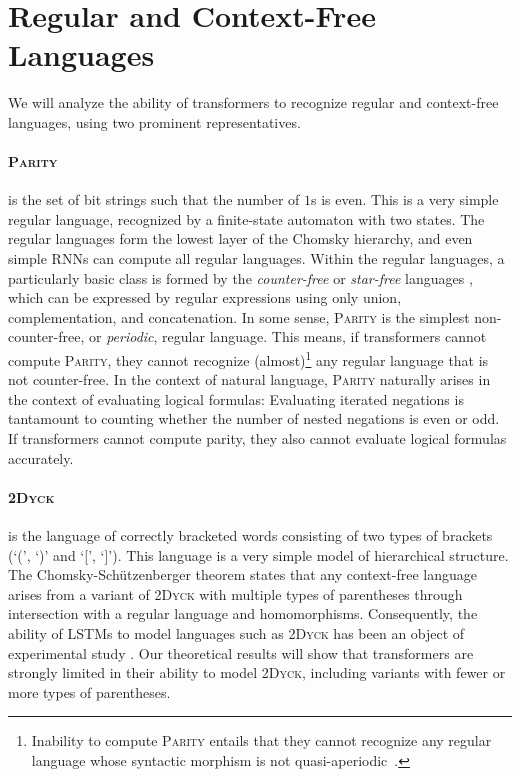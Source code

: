 \documentclass[11pt,a4paper]{article}
\newcounter{theorem}
\begin{document}
\section{Regular and Context-Free Languages}\label{sec:langs} 

We will analyze the ability of transformers to recognize regular and context-free languages, using two prominent representatives. 


\paragraph{\textsc{Parity}} is the set of bit strings such that the number of $1$s is even.
This is a very simple regular language, recognized by a finite-state automaton with two states.
The regular languages form the lowest layer of the Chomsky hierarchy, and even simple RNNs can compute all regular languages.
Within the regular languages, a particularly basic class is formed by the \emph{counter-free} or \emph{star-free} languages \cite{mcnaughton1971counter}, which can be expressed by regular expressions using only union, complementation, and concatenation.
In some sense, \textsc{Parity} is the simplest non-counter-free, or \emph{periodic}, regular language.
This means, if transformers cannot compute \textsc{Parity}, they cannot recognize (almost)\footnote{Inability to compute \textsc{Parity} entails that they cannot recognize any regular language whose syntactic morphism is not quasi-aperiodic~\cite[p. 488]{barrington1992regular}.} any regular language that is not counter-free.
In the context of natural language, \textsc{Parity} naturally arises in the context of evaluating logical formulas:
Evaluating iterated negations is tantamount to counting whether the number of nested negations is even or odd.
If transformers cannot compute parity, they also cannot evaluate logical formulas accurately.











\paragraph{\textsc{2Dyck}} is the language of correctly bracketed words consisting of two types of brackets (`(', `)' and `[', `]').
This language is a very simple model of hierarchical structure.
The Chomsky-Sch{\"u}tzenberger theorem \cite{chomsky1963algebraic} states that any context-free language arises from a variant of \textsc{2Dyck} with multiple types of parentheses through intersection with a regular language and homomorphisms.
Consequently, the ability of LSTMs to model languages such as \textsc{2Dyck} has been an object of experimental study \cite{sennhauser2018evaluating,skachkova2018closing,bernardy2018can}.
Our theoretical results will show that transformers are strongly limited in their ability to model \textsc{2Dyck}, including variants with fewer or more types of parentheses.
\end{document}
